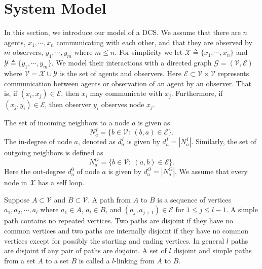 \documentclass[letterpaper, 10 pt, conference]{ieeeconf}
\begin{document}
\section{System Model}
In this section, we introduce our model of a DCS. We assume that there are $n$ agents, $x_1, \cdots, x_n$ communicating with each other, and that they are observed by $m$ observers, $y_1, \cdots, y_m$ where $m \le n$. For simplicity we let $\mathcal{X} \triangleq \{x_1, \cdots, x_n\}$ and $\mathcal{Y} \triangleq \{y_1, \cdots, y_m\}$. We model their interactions with a directed graph $\mathcal{G} = (\mathcal{V},\mathcal{E})$ where $\mathcal{V} = \mathcal{X} \cup \mathcal{Y}$ is the set of agents and observers. Here $\mathcal{E} \subset \mathcal{V} \times \mathcal{V}$ represents communication between agents or observation of an agent by an observer. That is, if $(x_i,x_j) \in \mathcal{E}$, then $x_i$ may communicate with $x_j$. Furthermore, if $(x_j, y_i) \in \mathcal{E}$, then observer $y_i$ observes node $x_j$. 


The set of incoming neighbors to a node $a$ is given as 
\begin{equation}
N_a^I = \{b \in \mathcal{V}:~(b,a) \in \mathcal{E}\}.
\end{equation}
The in-degree of node $a$, denoted as $d_a^I$ is given by $d_a^I = |N_a^I|$. Similarly, the set of outgoing neighbors is defined as
\begin{equation}
N_a^O = \{b \in \mathcal{V}:~(a,b) \in \mathcal{E}\}.
\end{equation}
Here the out-degree $d_a^0$ of node $a$ is given by $d_a^O = |N_a^O|$. We assume that every node in $\mathcal{X}$ has a self loop.

Suppose $A \subset \mathcal{V}$ and $B \subset \mathcal{V}$. A path from $A$ to $B$ is a sequence of vertices $a_1,a_2,\cdots,a_l$ where $a_1 \in A$, $a_l \in B$, and $(a_j,a_{j+1}) \in \mathcal{E}$ for $1 \le j \le l-1$. A simple path contains no repeated vertices. Two paths are disjoint if they have no common vertices and two paths are internally disjoint if they have no common vertices except for possibly the starting and ending vertices. In general $l$ paths are disjoint if any pair of paths are disjoint. A set of $l$ disjoint and simple paths from a set $A$ to a set $B$ is called a $l$-linking from $A$ to $B$.
\end{document}
